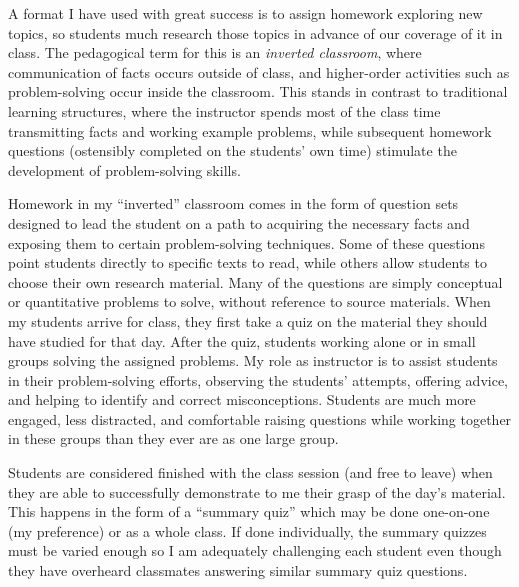\vskip 10pt

A format I have used with great success is to assign homework exploring new topics, so students much research those topics in advance of our coverage of it in class.  The pedagogical term for this is an \textit{inverted classroom}, where communication of facts occurs outside of class, and higher-order activities such as problem-solving occur inside the classroom.  This stands in contrast to traditional learning structures, where the instructor spends most of the class time transmitting facts and working example problems, while subsequent homework questions (ostensibly completed on the students' own time) stimulate the development of problem-solving skills.  

Homework in my ``inverted'' classroom comes in the form of question sets designed to lead the student on a path to acquiring the necessary facts and exposing them to certain problem-solving techniques.  Some of these questions point students directly to specific texts to read, while others allow students to choose their own research material.  Many of the questions are simply conceptual or quantitative problems to solve, without reference to source materials.  When my students arrive for class, they first take a quiz on the material they should have studied for that day.  After the quiz, students working alone or in small groups solving the assigned problems.  My role as instructor is to assist students in their problem-solving efforts, observing the students' attempts, offering advice, and helping to identify and correct misconceptions.  Students are much more engaged, less distracted, and comfortable raising questions while working together in these groups than they ever are as one large group.

Students are considered finished with the class session (and free to leave) when they are able to successfully demonstrate to me their grasp of the day's material.  This happens in the form of a ``summary quiz'' which may be done one-on-one (my preference) or as a whole class.  If done individually, the summary quizzes must be varied enough so I am adequately challenging each student even though they have overheard classmates answering similar summary quiz questions.

\vskip 10pt

